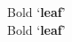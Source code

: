 \documentclass{article}
\begin{document}
	\noindent 
	Bold `\textbf{leaf}'\\
	Bold `\textbf{leaf\nocorr}'\\
\end{document}
